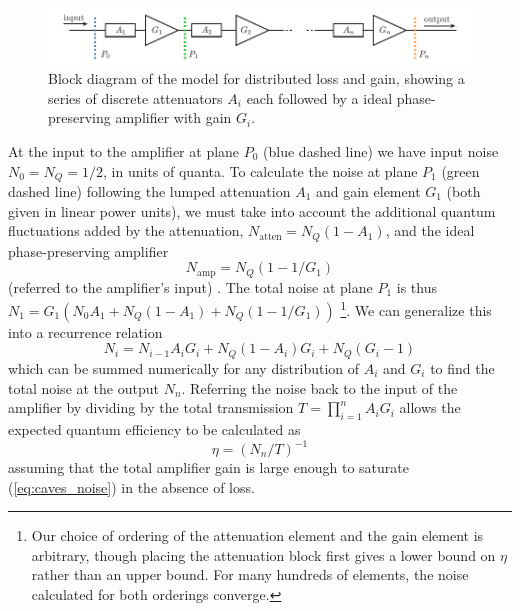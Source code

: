 \begin{figure}
\begin{center}
\includegraphics[width=6in]{twpa_theory/chained_caves_amp}
\end{center}
\caption[Distributed amplifier loss model]{Block diagram of the model for distributed loss and gain, showing a series of discrete attenuators $A_i$ each followed by a ideal phase-preserving amplifier with gain $G_i$.}
\label{fig:chained_caves_amp}
\end{figure}

At the input to the amplifier at plane $P_0$ (blue dashed line) we have input noise $N_0 = N_Q = 1/2$, in units of quanta.  To calculate the noise at plane $P_1$ (green dashed line) following the lumped attenuation $A_1$ and gain element $G_1$ (both given in linear power units), we must take into account the additional quantum fluctuations added by the attenuation, $N_{\textrm{atten}} = N_Q(1-A_1)$, and the ideal phase-preserving amplifier
\begin{equation}
N_{\textrm{amp}} = N_Q(1-1/G_1)
\label{eq:caves_noise}
\end{equation}
(referred to the amplifier's input) \cite{Caves1982a}.  The total noise at plane $P_1$ is thus $N_1 = G_1 ( N_0 A_1 + N_Q (1 - A_1) + N_Q(1 - 1/G_1))$ \footnote{Our choice of ordering of the attenuation element and the gain element is arbitrary, though placing the attenuation block first gives a lower bound on $\eta$ rather than an upper bound.  For many hundreds of elements, the noise calculated for both orderings converge.}.  We can generalize this into a recurrence relation
\begin{equation}
N_i = N_{i-1}A_i G_i + N_Q (1 - A_i) G_i + N_Q (G_i - 1)
\label{eq:caves_recurr}
\end{equation}
which can be summed numerically for any distribution of $A_i$ and $G_i$ to find the total noise at the output $N_n$.  Referring the noise back to the input of the amplifier by dividing by the total transmission $T = \prod_{i=1}^n A_i G_i$ allows the expected quantum efficiency to be calculated as
\begin{equation}
\eta = (N_n / T)^{-1}
\label{eq:eta_D}
\end{equation}
assuming that the total amplifier gain is large enough to saturate (\ref{eq:caves_noise}) in the absence of loss.







